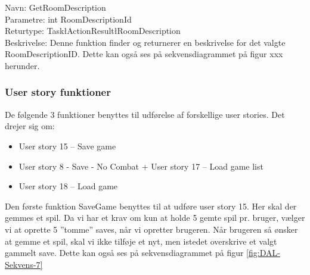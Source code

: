 Navn: GetRoomDescription \\
Parametre: int RoomDescriptionId \\
Returtype: Task\l ActionResult\l RoomDescription\g\g\\
Beskrivelse: Denne funktion finder og returnerer en beskrivelse for det valgte RoomDescriptionID. 
Dette kan også ses på sekvensdiagrammet på figur xxx herunder.


\subsubsection{User story funktioner}
De følgende 3 funktioner benyttes til udførelse af forskellige user stories.
Det drejer sig om:
\begin{itemize}
\item User story 15 – Save game
\item User story 8 - Save - No Combat  + User story 17 – Load game list 
\item User story 18 – Load game \\
\end{itemize}

Den første funktion SaveGame benyttes til at udføre user story 15.
Her skal der gemmes et spil.
Da vi har et krav om kun at holde 5 gemte spil pr. bruger, vælger vi at oprette 5 ”tomme” saves, når vi opretter brugeren.  
Når brugeren så ønsker at gemme et spil, skal vi ikke tilføje et nyt, men istedet overskrive et valgt gammelt save.
Dette kan også ses på sekvensdiagrammet på figur \autoref{fig:DAL-Sekvens-7}\\



